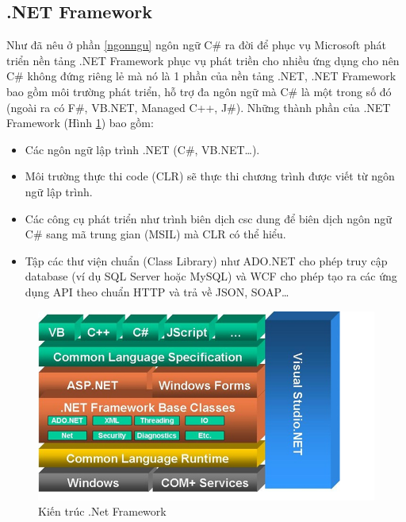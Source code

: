 \subsection{.NET Framework}
Như đã nêu ở phần \ref{ngonngu} ngôn ngữ C\# ra đời để phục vụ Microsoft phát triển nền tảng .NET Framework phục vụ phát triền cho nhiều ứng dụng cho nên C\# không đứng riêng lẻ mà nó là 1 phần của nền tảng .NET, .NET Framework bao gồm môi trường phát triển, hỗ trợ đa ngôn ngữ mà C\# là một trong số đó (ngoài ra có F\#, VB.NET, Managed C++, J\#).
Những thành phần của .NET Framework (Hình \ref{refhinh2_1}) bao gồm:
\begin{itemize}
\item Các ngôn ngữ lập trình .NET (C\#, VB.NET…).
\item Môi trường thực thi code (CLR) sẽ thực thi chương trình được viết từ ngôn ngữ lập trình.
\item Các công cụ phát triển như trình biên dịch csc dung để biên dịch ngôn ngữ C\# sang mã trung gian (MSIL) mà CLR có thể hiểu.
\item Tập các thư viện chuẩn (Class Library) như ADO.NET cho phép truy cập database (ví dụ SQL Server hoặc MySQL) và WCF cho phép tạo ra các ứng dụng API theo chuẩn HTTP và trả về JSON, SOAP…
\end{itemize}
\begin{center}
    \begin{figure}[h]
    \begin{center}
     \includegraphics[scale=0.6]{image/kienTrucDotNet.png}
    \end{center}
    \caption{Kiến trúc .Net Framework}
    \label{refhinh2_1}
    \end{figure}
\end{center}
